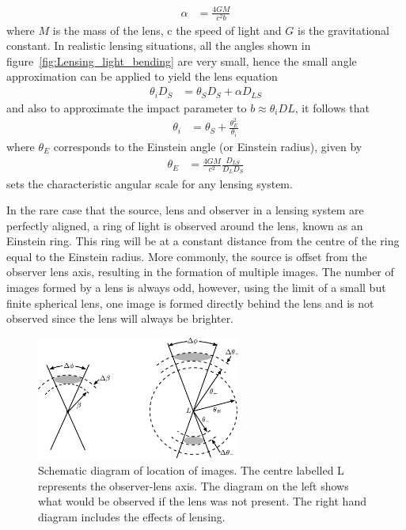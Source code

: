         \begin{align}
            \alpha &= \frac{4GM}{c^2 b}
        \end{align}
        where $M$ is the mass of the lens, c the speed of light and $G$ is the gravitational constant. In realistic lensing situations, all the angles shown in figure~\ref{fig:Lensing_light_bending} are very small, hence the small angle approximation can be applied to yield the lens equation
        \begin{align}
            \theta_i D_S &= \theta_S D_S + \alpha D_{LS}
        \end{align}
        and also to approximate the impact parameter to $b\approx\theta_i DL$, it follows that
        \begin{align}
            \theta_i &= \theta_S + \frac{\theta_E^2}{\theta_i} \label{eq:einstein_angle}
        \end{align}
        where $\theta_E$ corresponds to the Einstein angle (or Einstein radius), given by
        \begin{align}
            \theta_E &= \frac{4GM}{c^2}\frac{D_{LS}}{D_L D_S}
        \end{align}
        sets the characteristic angular scale for any lensing system\cite{Hartle}.

        In the rare case that the source, lens and observer in a lensing system are perfectly aligned, a ring of light is observed around the lens, known as an Einstein ring. This ring will be at a constant distance from the centre of the ring equal to the Einstein radius. More commonly, the source is offset from the observer lens axis, resulting in the formation of multiple images. The number of images formed by a lens is always odd, however, using the limit of a small but finite spherical lens, one image is formed directly behind the lens and is not observed since the lens will always be brighter.
        \begin{figure}[!htb]
            \centering
                \includegraphics[width=0.6\textwidth]{../Images/Lensing_image_positions2.pdf}
                \caption[Schematic diagram of location of images]{Schematic diagram of location of images. The centre labelled L represents the observer-lens axis. The diagram on the left shows what would be observed if the lens was not present. The right hand diagram includes the effects of lensing\cite{Hartle}.\label{fig:Lensing_image_positions2}}
        \end{figure}

